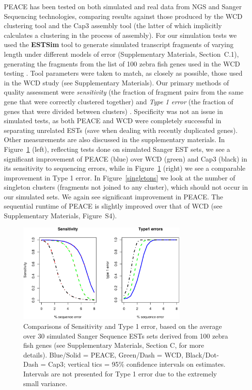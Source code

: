 \documentclass[a4,center,fleqn]{NAR}
\newcommand{\peace} {{\small PEACE}}
\newcommand{\wcd} {{\small WCD}}
\newcommand{\capthree} {{\small Cap3}}
\begin{document}
\peace\/ has been tested on both simulated and real data from NGS and
Sanger Sequencing technologies, comparing results against those
produced by the \wcd\/ clustering tool \cite{Hazelhurst08a} and the
\capthree\/ assembly tool \cite{Huang99} (the latter of which
implicitly calculates a clustering in the process of assembly).  For our
simulation tests we used the {\bf ESTSim} tool \cite{Hazelhurst03} to
generate simulated transcript fragments of varying length under
different models of error (Supplementary Materials, Section~C.1),
generating the fragments from the list of 100 zebra fish genes used in
the \wcd\/ testing \cite{Hazelhurst08a}.  Tool parameters were taken
to match, as closely as possible, those used in the \wcd\/ study (see
Supplementary Materials).  Our primary methods of quality assessment
were {\it sensitivity} (the fraction of fragment pairs from the same
gene that were correctly clustered together) and {\it Type 1 error}
(the fraction of genes that were divided between clusters)
\cite{Wang04,Hazelhurst08a}.  Specificity was not an issue in
simulated tests, as both \peace\/ and \wcd\/ were completely successful
in separating unrelated ESTs (save when dealing with recently
duplicated genes).  Other measurements are also discussed in the
supplementary materials.  In Figure~\ref{SeT1} (left), reflecting
tests done on simulated Sanger EST sets, we see a
significant improvement of \peace\/ (blue) over \wcd\/ (green) and
\capthree\/ (black) in its sensitivity to sequencing errors, while in
Figure~\ref{SeT1} (right) we see a comparable improvement in Type 1
error.  In Figure~\ref{singletons} we look at the number of singleton
clusters (fragments not joined to any cluster), which should not occur
in our simulated sets.  We again see significant improvement in \peace.
The sequential runtime of \peace\/ is slightly improved over that of
\wcd\/ (see Supplementary Materials, Figure~S4).

\begin{figure}
  \centerline{\includegraphics[width=3.35in]{pics.d/SeT1.pdf}}
  \caption{Comparisons of Sensitivity and Type 1 error, based on the
    average over 30 simulated Sanger Sequence ESTs sets derived from 100 zebra
    fish genes  (see
    Supplementary Materials, Section C, for more details).  Blue/Solid
    = \peace, Green/Dash = \wcd, Black/Dot-Dash = \capthree; vertical
    tics = 95\% confidence intervals on estimates.  Intervals are not
    presented for Type 1 error due to the extremely small
    variance.}\label{SeT1}
\end{figure}
\end{document}
